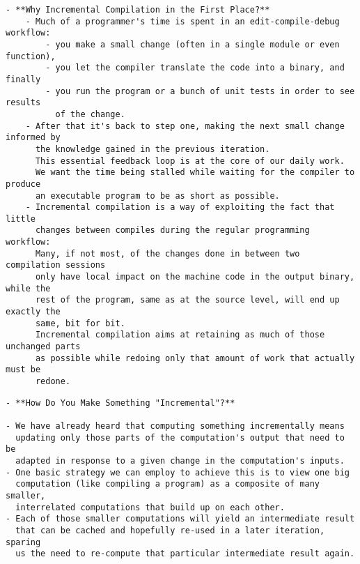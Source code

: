\documentclass[12pt, a4paper]{report}
\begin{document}
\begin{verbatim}
- **Why Incremental Compilation in the First Place?**
	- Much of a programmer's time is spent in an edit-compile-debug workflow:
		- you make a small change (often in a single module or even function),
		- you let the compiler translate the code into a binary, and finally
		- you run the program or a bunch of unit tests in order to see results
		  of the change.
	- After that it's back to step one, making the next small change informed by
	  the knowledge gained in the previous iteration.
	  This essential feedback loop is at the core of our daily work.
	  We want the time being stalled while waiting for the compiler to produce
	  an executable program to be as short as possible.
	- Incremental compilation is a way of exploiting the fact that little
	  changes between compiles during the regular programming workflow:
	  Many, if not most, of the changes done in between two compilation sessions
	  only have local impact on the machine code in the output binary, while the
	  rest of the program, same as at the source level, will end up exactly the
	  same, bit for bit.
	  Incremental compilation aims at retaining as much of those unchanged parts
	  as possible while redoing only that amount of work that actually must be
	  redone.
\end{verbatim}

\begin{verbatim}
- **How Do You Make Something "Incremental"?**

- We have already heard that computing something incrementally means
  updating only those parts of the computation's output that need to be
  adapted in response to a given change in the computation's inputs.
- One basic strategy we can employ to achieve this is to view one big
  computation (like compiling a program) as a composite of many smaller,
  interrelated computations that build up on each other.
- Each of those smaller computations will yield an intermediate result
  that can be cached and hopefully re-used in a later iteration, sparing
  us the need to re-compute that particular intermediate result again.
\end{verbatim}
\end{document}
